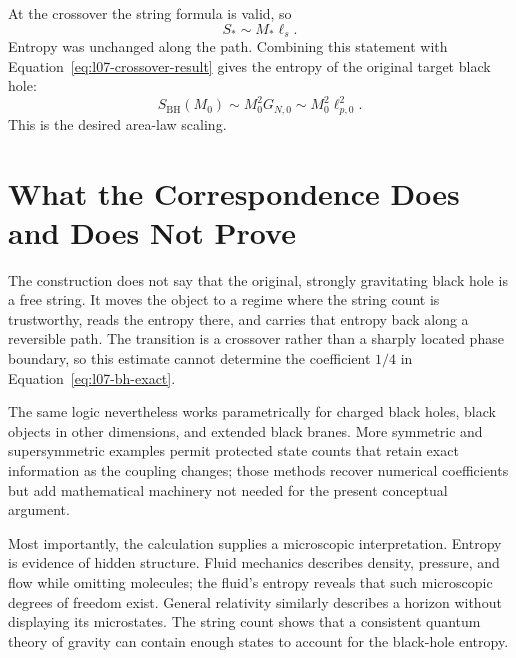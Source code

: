 At the crossover the string formula is valid, so
\begin{equation}
S_*\sim M_*\ell_s.
\end{equation}
Entropy was unchanged along the path. Combining this statement with Equation~\eqref{eq:l07-crossover-result} gives the entropy of the original target black hole:
\begin{equation}
S_{\mathrm{BH}}(M_0)
\sim M_0^2G_{N,0}
\sim M_0^2\ell_{p,0}^2.
\label{eq:l07-final-correspondence}
\end{equation}
This is the desired area-law scaling.

\section{What the Correspondence Does and Does Not Prove}

The construction does not say that the original, strongly gravitating black hole is a free string. It moves the object to a regime where the string count is trustworthy, reads the entropy there, and carries that entropy back along a reversible path. The transition is a crossover rather than a sharply located phase boundary, so this estimate cannot determine the coefficient \(1/4\) in Equation~\eqref{eq:l07-bh-exact}.

The same logic nevertheless works parametrically for charged black holes, black objects in other dimensions, and extended black branes. More symmetric and supersymmetric examples permit protected state counts that retain exact information as the coupling changes; those methods recover numerical coefficients but add mathematical machinery not needed for the present conceptual argument.

Most importantly, the calculation supplies a microscopic interpretation. Entropy is evidence of hidden structure. Fluid mechanics describes density, pressure, and flow while omitting molecules; the fluid's entropy reveals that such microscopic degrees of freedom exist. General relativity similarly describes a horizon without displaying its microstates. The string count shows that a consistent quantum theory of gravity can contain enough states to account for the black-hole entropy.

\begin{classroomqa}
\end{classroomqa}

